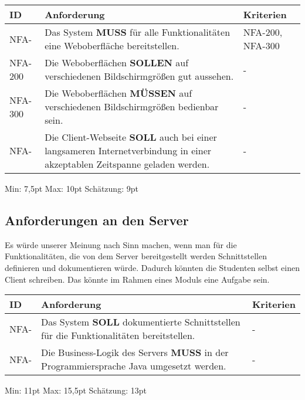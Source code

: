 \vspace{12pt}

\begin{tabular} {|p{}|p{11cm}|p{}|}
	\hline
	ID & Anforderung & Kriterien \\
	\hline
	NFA-
	& Das System \textbf{MUSS} für alle Funktionalitäten eine Weboberfläche bereitstellen. 
	& NFA-200, NFA-300 \\
	\hline
	NFA-200 
	& Die Weboberflächen \textbf{SOLLEN} auf verschiedenen Bildschirmgrößen gut aussehen.
	& -  \\
	\hline
	NFA-300
	& Die Weboberflächen \textbf{MÜSSEN} auf verschiedenen Bildschirmgrößen bedienbar sein.
	& - \\
	\hline
	NFA-
	& Die Client-Webseite \textbf{SOLL} auch bei einer langsameren Internetverbindung in einer akzeptablen Zeitspanne geladen werden.
	& - \\
	\hline
\end{tabular}
Min: 7,5pt
Max: 10pt
Schätzung: 9pt

\newpage

\subsection{Anforderungen an den Server}
Es würde unserer Meinung nach Sinn machen, wenn man für die Funktionalitäten, die von dem Server bereitgestellt werden Schnittstellen definieren und dokumentieren würde. Dadurch könnten die Studenten selbst einen Client schreiben. Das könnte im Rahmen eines Moduls eine Aufgabe sein. 

\vspace{12pt}

\begin{tabular} {|p{}|p{11cm}|p{}|}
	\hline
	ID & Anforderung & Kriterien \\
	\hline
	NFA- 
	& Das System \textbf{SOLL} dokumentierte Schnittstellen für die Funktionalitäten bereitstellen.
	& - \\
	\hline
	NFA- 
	& Die Business-Logik des Servers \textbf{MUSS} in der Programmiersprache Java umgesetzt werden.
	& - \\
	\hline
\end{tabular}
Min: 11pt
Max: 15,5pt
Schätzung: 13pt
